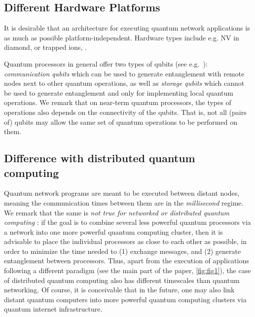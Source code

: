 \subsection{Different Hardware Platforms} 

It is desirable that an architecture for executing quantum network applications is as much as possible platform-independent. Hardware types include e.g. NV in diamond, or trapped ions, .

Quantum processors in general offer two types of qubits (see e.g.~\cite{dahlberg_2019_egp}): \emph{communication qubits} which can be used to generate entanglement with remote nodes next to other quantum operations, as well as \emph{storage qubits} which cannot be used to generate entanglement and only for implementing local quantum operations. We remark that on near-term quantum processors, the types of operations also depends on the connectivity of the qubits. That is, not all (pairs of) qubits may allow the same set of quantum operations to be performed on them.

\subsection{Difference with distributed quantum computing}

Quantum network programs are meant to be executed between distant nodes, meaning the communication times between them are in the \emph{millisecond} regime. We remark that the same is \emph{not true for networked or distributed quantum computing }: if the goal is to combine several less powerful quantum processors via a network into one more powerful quantum computing cluster, then it is advisable to place the individual processors as close to each other as possible, in order to minimize the time needed to (1) exchange messages, and (2) generate entanglement between processors. Thus, apart from the execution of applications following a different paradigm (see the main part of the paper, \cref{fig:fig1}),
the case of distributed quantum computing also has different timescales than quantum networking. Of course, it is conceivable that in the future, one may also link distant quantum computers into more powerful quantum computing clusters via quantum internet infrastructure.


